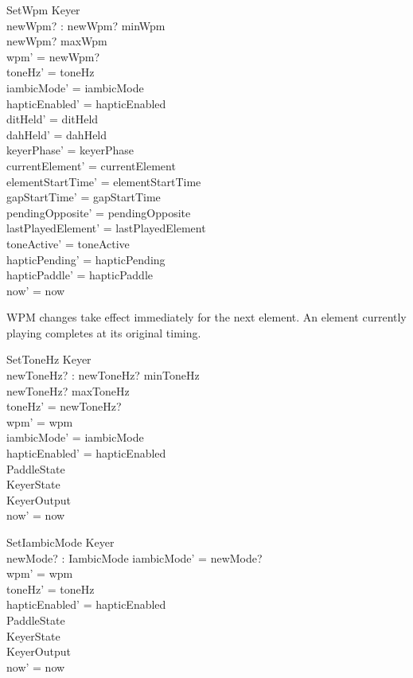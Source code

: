 \documentclass[a4paper,10pt,fleqn]{article}
\begin{document}
\begin{schema}{SetWpm}
\Delta Keyer \\
newWpm? : \nat
\where
newWpm? \geq minWpm \\
newWpm? \leq maxWpm \\
wpm' = newWpm? \\
toneHz' = toneHz \\
iambicMode' = iambicMode \\
hapticEnabled' = hapticEnabled \\
ditHeld' = ditHeld \\
dahHeld' = dahHeld \\
keyerPhase' = keyerPhase \\
currentElement' = currentElement \\
elementStartTime' = elementStartTime \\
gapStartTime' = gapStartTime \\
pendingOpposite' = pendingOpposite \\
lastPlayedElement' = lastPlayedElement \\
toneActive' = toneActive \\
hapticPending' = hapticPending \\
hapticPaddle' = hapticPaddle \\
now' = now
\end{schema}

WPM changes take effect immediately for the next element. An element currently
playing completes at its original timing.

\begin{schema}{SetToneHz}
\Delta Keyer \\
newToneHz? : \nat
\where
newToneHz? \geq minToneHz \\
newToneHz? \leq maxToneHz \\
toneHz' = newToneHz? \\
wpm' = wpm \\
iambicMode' = iambicMode \\
hapticEnabled' = hapticEnabled \\
\Xi PaddleState \\
\Xi KeyerState \\
\Xi KeyerOutput \\
now' = now
\end{schema}

\begin{schema}{SetIambicMode}
\Delta Keyer \\
newMode? : IambicMode
\where
iambicMode' = newMode? \\
wpm' = wpm \\
toneHz' = toneHz \\
hapticEnabled' = hapticEnabled \\
\Xi PaddleState \\
\Xi KeyerState \\
\Xi KeyerOutput \\
now' = now
\end{schema}
\end{document}
